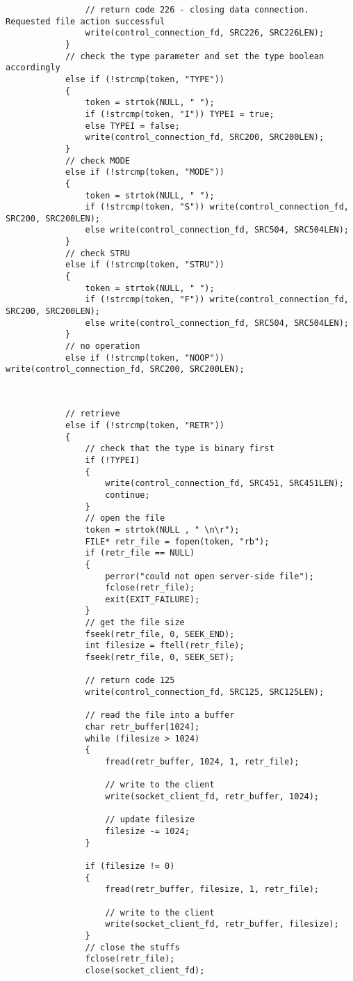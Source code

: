\documentclass[12pt,letter,titlepage]{article}
\begin{document}
{{\begin{verbatim}
				// return code 226 - closing data connection. Requested file action successful
				write(control_connection_fd, SRC226, SRC226LEN);
			}
			// check the type parameter and set the type boolean accordingly
			else if (!strcmp(token, "TYPE")) 
			{
				token = strtok(NULL, " ");
				if (!strcmp(token, "I")) TYPEI = true;
				else TYPEI = false;
				write(control_connection_fd, SRC200, SRC200LEN);
			}
			// check MODE
			else if (!strcmp(token, "MODE")) 
			{
				token = strtok(NULL, " ");
				if (!strcmp(token, "S")) write(control_connection_fd, SRC200, SRC200LEN);
				else write(control_connection_fd, SRC504, SRC504LEN);
			}
			// check STRU
			else if (!strcmp(token, "STRU")) 
			{
				token = strtok(NULL, " ");
				if (!strcmp(token, "F")) write(control_connection_fd, SRC200, SRC200LEN);
				else write(control_connection_fd, SRC504, SRC504LEN);
			}
			// no operation
			else if (!strcmp(token, "NOOP")) write(control_connection_fd, SRC200, SRC200LEN);
			
\end{verbatim}
\pagebreak
\begin{verbatim}

			// retrieve
			else if (!strcmp(token, "RETR"))
			{
				// check that the type is binary first
				if (!TYPEI) 
				{
					write(control_connection_fd, SRC451, SRC451LEN);
					continue;
				}
				// open the file
				token = strtok(NULL , " \n\r");
				FILE* retr_file = fopen(token, "rb");
				if (retr_file == NULL)
				{
					perror("could not open server-side file");
					fclose(retr_file);
					exit(EXIT_FAILURE);
				}
				// get the file size
				fseek(retr_file, 0, SEEK_END);
				int filesize = ftell(retr_file);
				fseek(retr_file, 0, SEEK_SET);

				// return code 125
				write(control_connection_fd, SRC125, SRC125LEN);

				// read the file into a buffer
				char retr_buffer[1024];
				while (filesize > 1024)
				{
					fread(retr_buffer, 1024, 1, retr_file);

					// write to the client
					write(socket_client_fd, retr_buffer, 1024);

					// update filesize
					filesize -= 1024;
				}

				if (filesize != 0)
				{
					fread(retr_buffer, filesize, 1, retr_file);

					// write to the client
					write(socket_client_fd, retr_buffer, filesize);
				}
				// close the stuffs
				fclose(retr_file);
				close(socket_client_fd);


\end{verbatim}}}
\end{document}
